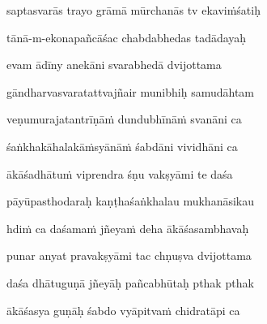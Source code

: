 
saptasvarās trayo grāmā mūrchanās tv ekavi\.mśatiḥ\thinspace{\dandab} \dontdisplaylinenum

tānā-m-ekonapañcāśac chabdabhedas tadādayaḥ \veg\dontdisplaylinenum

evam ādīny anekāni svarabhedā dvijottama\thinspace{\dandab} \dontdisplaylinenum

gāndharvasvaratattvajñair munibhiḥ samudāhtam \veg\dontdisplaylinenum

veṇumurajatantrīṇā\.m dundubhīnā\.m svanāni ca\thinspace{\dandab} \dontdisplaylinenum

śaṅkhakāhalakā\.msyānā\.m śabdāni vividhāni ca \veg\dontdisplaylinenum



ākāśadhātu\.m viprendra śṇu vakṣyāmi te daśa\thinspace{\dandab} \dontdisplaylinenum

pāyūpasthodaraḥ kaṇṭhaśaṅkhalau mukhanāsikau \veg\dontdisplaylinenum

hdi\.m ca daśama\.m jñeya\.m deha ākāśasambhavaḥ\thinspace{\dandab} \dontdisplaylinenum

punar anyat pravakṣyāmi tac chṇuṣva dvijottama \veg\dontdisplaylinenum

daśa dhātuguṇā jñeyāḥ pañcabhūtaḥ pthak pthak\thinspace{\dandab} \dontdisplaylinenum

ākāśasya guṇāḥ śabdo vyāpitva\.m chidratāpi ca \veg\dontdisplaylinenum

